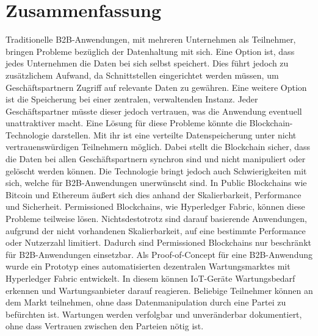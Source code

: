 \pagestyle{empty} %

\chapter*{Zusammenfassung} %
\label{cha:abtract}

Traditionelle \acs{B2B}-Anwendungen, mit mehreren Unternehmen als Teilnehmer, bringen Probleme bezüglich der Datenhaltung mit sich. Eine Option ist, dass jedes Unternehmen die Daten bei sich selbst speichert. Dies führt jedoch zu zusätzlichem Aufwand, da Schnittstellen eingerichtet werden müssen, um Geschäftspartnern Zugriff auf relevante Daten zu gewähren. Eine weitere Option ist die Speicherung bei einer zentralen, verwaltenden Instanz. Jeder Geschäftspartner müsste dieser jedoch vertrauen, was die Anwendung eventuell unattraktiver macht. Eine Lösung für diese Probleme könnte die Blockchain-Technologie darstellen. Mit ihr ist eine verteilte Datenspeicherung unter nicht vertrauenswürdigen Teilnehmern möglich. Dabei stellt die Blockchain sicher, dass die Daten bei allen Geschäftspartnern synchron sind und nicht manipuliert oder gelöscht werden können. Die Technologie bringt jedoch auch Schwierigkeiten mit sich, welche für \acs{B2B}-Anwendungen unerwünscht sind. In Public Blockchains wie Bitcoin und Ethereum äußert sich dies anhand der Skalierbarkeit, Performance und Sicherheit. Permissioned Blockchains, wie Hyperledger Fabric, können diese Probleme teilweise lösen. Nichtsdestotrotz sind darauf basierende Anwendungen, aufgrund der nicht vorhandenen Skalierbarkeit, auf eine bestimmte Performance oder Nutzerzahl limitiert. Dadurch sind Permissioned Blockchains nur beschränkt für \acs{B2B}-Anwendungen einsetzbar. Als Proof-of-Concept für eine \acs{B2B}-Anwendung wurde ein Prototyp eines automatisierten dezentralen Wartungsmarktes mit Hyperledger Fabric entwickelt. In diesem können \acs{IoT}-Geräte Wartungsbedarf erkennen und Wartungsanbieter darauf reagieren. Beliebige Teilnehmer können an dem Markt teilnehmen, ohne dass Datenmanipulation durch eine Partei zu befürchten ist. Wartungen werden verfolgbar und unveränderbar dokumentiert, ohne dass Vertrauen zwischen den Parteien nötig ist.
